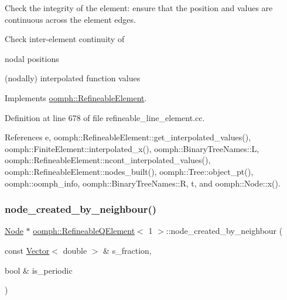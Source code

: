 Check the integrity of the element\+: ensure that the position and values are continuous across the element edges. 

Check inter-\/element continuity of
\begin{DoxyItemize}
\item nodal positions
\item (nodally) interpolated function values 
\end{DoxyItemize}

Implements \hyperlink{classoomph_1_1RefineableElement_ae665f2d2eb0b6410ddcb101caa80922a}{oomph\+::\+Refineable\+Element}.



Definition at line 678 of file refineable\+\_\+line\+\_\+element.\+cc.



References e, oomph\+::\+Refineable\+Element\+::get\+\_\+interpolated\+\_\+values(), oomph\+::\+Finite\+Element\+::interpolated\+\_\+x(), oomph\+::\+Binary\+Tree\+Names\+::L, oomph\+::\+Refineable\+Element\+::ncont\+\_\+interpolated\+\_\+values(), oomph\+::\+Refineable\+Element\+::nodes\+\_\+built(), oomph\+::\+Tree\+::object\+\_\+pt(), oomph\+::oomph\+\_\+info, oomph\+::\+Binary\+Tree\+Names\+::R, t, and oomph\+::\+Node\+::x().

\mbox{\label{classoomph_1_1RefineableQElement_3_011_01_4_ad415f7f3dffe9e990dc690deed3a0666}} 
\subsubsection{\texorpdfstring{node\+\_\+created\+\_\+by\+\_\+neighbour()}{node\_created\_by\_neighbour()}}
{\footnotesize\ttfamily \hyperlink{classoomph_1_1Node}{Node} $\ast$ \hyperlink{classoomph_1_1RefineableQElement}{oomph\+::\+Refineable\+Q\+Element}$<$ 1 $>$\+::node\+\_\+created\+\_\+by\+\_\+neighbour (\begin{DoxyParamCaption}\item[{const \hyperlink{classoomph_1_1Vector}{Vector}$<$ double $>$ \&}]{s\+\_\+fraction,  }\item[{bool \&}]{is\+\_\+periodic }\end{DoxyParamCaption})}



